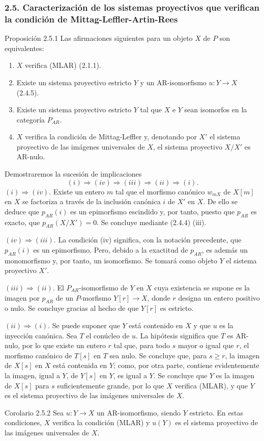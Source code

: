 \subsubsection*{2.5. Caracterización de los sistemas proyectivos que verifican la condición de Mittag-Leffler-Artin-Rees}
\begin{statement}{Proposición 2.5.1}
Las afirmaciones siguientes para un objeto $X$ de $P$ son equivalentes:
\begin{enumerate}[label=(\roman*)]
\item $X$ verifica (MLAR) (2.1.1).
\item Existe un sistema proyectivo estricto $Y$ y un AR-isomorfismo $u:Y\to X$ (2.4.5).
\item Existe un sistema proyectivo estricto $Y$ tal que $X$ e $Y$ sean isomorfos en la categoría $P_{AR}$.
\item $X$ verifica la condición de Mittag-Leffler y, denotando por $X'$ el sistema proyectivo de las imágenes universales de $X$, el sistema proyectivo $X/X'$ es AR-nulo.
\end{enumerate}
\end{statement}

\begin{prooftext}[Demostración]
Demostraremos la sucesión de implicaciones
\[
(i)\Rightarrow(iv)\Rightarrow(iii)\Rightarrow(ii)\Rightarrow(i).
\]
$(i)\Rightarrow(iv)$. Existe un entero $m$ tal que el morfismo canónico $w_{mX}$ de $X[m]$ en $X$ se factoriza a través de la inclusión canónica $i$ de $X'$ en $X$. De ello se deduce que $p_{AR}(i)$ es un epimorfismo escindido y, por tanto, puesto que $p_{AR}$ es exacto, que $p_{AR}(X/X')=0$. Se concluye mediante (2.4.4) (iii).

$(iv)\Rightarrow(iii)$. La condición (iv) significa, con la notación precedente, que $p_{AR}(i)$ es un epimorfismo. Pero, debido a la exactitud de $p_{AR}$, es además un monomorfismo y, por tanto, un isomorfismo. Se tomará como objeto $Y$ el sistema proyectivo $X'$.

$(iii)\Rightarrow(ii)$. El $P_{AR}$-isomorfismo de $Y$ en $X$ cuya existencia se supone es la imagen por $p_{AR}$ de un $P$-morfismo $Y[r]\to X$, donde $r$ designa un entero positivo o nulo. Se concluye gracias al hecho de que $Y[r]$ es estricto.

$(ii)\Rightarrow(i)$. Se puede suponer que $Y$ está contenido en $X$ y que $u$ es la inyección canónica. Sea $T$ el conúcleo de $u$. La hipótesis significa que $T$ es AR-nulo, por lo que existe un entero $r$ tal que, para todo $s$ mayor o igual que $r$, el morfismo canónico de $T[s]$ en $T$ sea nulo. Se concluye que, para $s\ge r$, la imagen de $X[s]$ en $X$ está contenida en $Y$; como, por otra parte, contiene evidentemente la imagen, igual a $Y$, de $Y[s]$ en $Y$, es igual a $Y$. Se concluye que $Y$ es la imagen de $X[s]$ para $s$ suficientemente grande, por lo que $X$ verifica (MLAR), y que $Y$ es el sistema proyectivo de las imágenes universales de $X$.
\end{prooftext}

\begin{statement}{Corolario 2.5.2}
Sea $u:Y\to X$ un AR-isomorfismo, siendo $Y$ estricto. En estas condiciones, $X$ verifica la condición (MLAR) y $u(Y)$ es el sistema proyectivo de las imágenes universales de $X$.
\end{statement}
